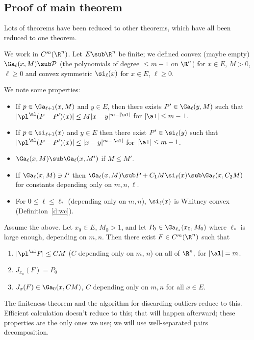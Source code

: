 


\subsection{Proof of main theorem}

Lots of theorems have been reduced to other theorems, which have all been reduced to one theorem.

We work in $C^m(\R^n)$. Let $E\sub \R^n$ be finite; we defined convex (maybe empty) $\Ga_\ell(x,M)\sub \cal P$ (the polynomials of degree $\le m-1$ on $\R^n$) for $x\in E$, $M>0$, $\ell\ge 0$ and convex symmetric $\si_\ell(x)$ for $x\in E$, $\ell\ge 0$. 

We note some properties:
\begin{itemize}
\item
If $p\in \Ga_{\ell+1}(x,M)$ and $y\in E$, then there exists $P'\in \Ga_\ell(y,M)$ such that $|\pl^\al(P-P')(x)|\le M|x-y|^{m-|\al|}$ for $|\al|\le m-1$. 
\item
If $p\in \si_{\ell+1}(x)$ and $y\in E$ then there exist $P'\in \si_\ell(y)$ such that $|\pl^\al(P-P')(x)|\le |x-y|^{m-|\al|}$ for $|\al|\le m-1$.
\item
$\Ga_\ell(x,M)\sub \Ga_\ell(x,M')$ if $M\le M'$.
\item
If $\Ga_\ell(x,M)\ni P$ then $\Ga_\ell(x,M)\sub P+C_1M \si_\ell(x)\sub \Ga_\ell(x,C_2M)$ for constants depending only on $m,n,\ell$.
\item
For $0\le \ell\le \ell_*$ (depending only on $m,n$), $\si_\ell(x)$ is Whitney convex (Definition~\ref{d:wc}).
\end{itemize}

\begin{thm}
Assume the above. Let $x_0\in E$, $M_0>1$, and let $P_0\in \Ga_{\ell_*}(x_0,M_0)$ where $\ell_*$ is large enough, depending on $m,n$. Then there exist $F\in C^m(\R^n)$ such that 
\begin{enumerate}
\item
$|\pl^\al F|\le CM$ ($C$ depending only on $m$, $n$) on all of $\R^n$, for $|\al|=m$.
\item
$J_{x_0}(F)=P_0$ 
\item
$J_x(F)\in \Ga_0(x,CM)$, $C$ depending only on $m,n$ for all $x\in E$.
\end{enumerate}
\end{thm}
The finiteness theorem %
and the algorithm for discarding outliers reduce to this. Efficient calculation doesn't reduce to this; that will happen afterward; these properties are the only ones we use; we will use well-separated pairs decomposition.

